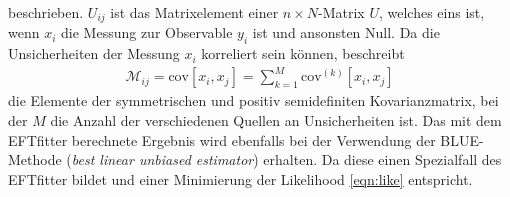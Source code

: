beschrieben. $U_{ij}$ ist das Matrixelement einer $n \times N$-Matrix $U$, welches eins ist, wenn $x_i$ die Messung zur Observable $y_i$ ist und ansonsten Null. Da die Unsicherheiten der Messung $x_i$ korreliert sein können, beschreibt
\begin{align}
  \mathcal{M}_{ij} = \text{cov}[x_i, x_j] = \sum_{k=1}^{M} \text{cov}^{(k)}[x_i, x_j]
\end{align}
die Elemente der symmetrischen und positiv semidefiniten Kovarianzmatrix, bei der $M$ die Anzahl der verschiedenen Quellen an Unsicherheiten ist. Das mit dem EFTfitter berechnete Ergebnis wird ebenfalls bei der Verwendung der BLUE-Methode (\textit{best linear unbiased estimator})\cite{LYONS1988110} erhalten. Da diese einen Spezialfall des EFTfitter bildet und einer Minimierung der Likelihood \eqref{eqn:like} entspricht.

